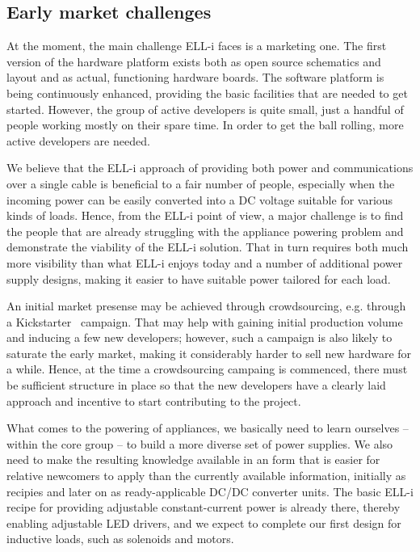\documentclass[draft,a4paper]{siamltex}
\begin{document}
\subsection{Early market challenges}
\label{ssec:earlymarket}

At the moment, the main challenge ELL-i faces is a marketing one.  The
first version of the hardware platform exists both as open source
schematics and layout and as actual, functioning hardware boards.  The
software platform is being continuously enhanced, providing the basic
facilities that are needed to get started.  However, the group of
active developers is quite small, just a handful of people working
mostly on their spare time.  In order to get the ball rolling, more
active developers are needed.

We believe that the ELL-i approach of providing both power and
communications over a single cable is beneficial to a fair number of
people, especially when the incoming power can be easily converted
into a DC voltage suitable for various kinds of loads.  Hence, from
the ELL-i point of view, a major challenge is to find the people that
are already struggling with the appliance powering problem and
demonstrate the viability of the ELL-i solution.  That in turn
requires both much more visibility than what ELL-i enjoys today and a
number of additional power supply designs, making it easier to have
suitable power tailored for each load.

An initial market presense may be achieved through crowdsourcing,
e.g. through a Kickstarter~\cite{Kickstarter} campaign.  That may help
with gaining initial production volume and inducing a few new
developers; however, such a campaign is also likely to saturate the
early market, making it considerably harder to sell new hardware for a
while.  Hence, at the time a crowdsourcing campaing is commenced,
there must be sufficient structure in place so that the new developers
have a clearly laid approach and incentive to start contributing to
the project.

What comes to the powering of appliances, we basically need to learn
ourselves -- within the core group -- to build a more diverse set of
power supplies.  We also need to make the resulting knowledge
available in an form that is easier for relative newcomers to apply
than the currently available information, initially as recipies and
later on as ready-applicable DC/DC converter units.  The basic ELL-i
recipe for providing adjustable constant-current power is already
there, thereby enabling adjustable LED drivers, and we expect to
complete our first design for inductive loads, such as solenoids and
motors.
\end{document}
